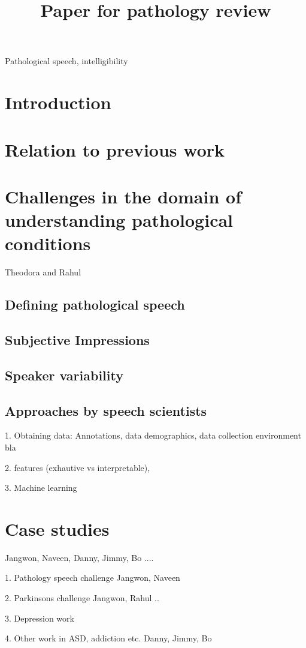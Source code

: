 \documentclass{article}
\title{Paper for pathology review}
\begin{document}
\ninept
%
\maketitle
%
\begin{abstract}
 
\end{abstract}
%
\begin{keywords}
Pathological speech, intelligibility 
\end{keywords}
%
\section{Introduction}
\label{sec:intro}

\section{Relation to previous work}

\section{Challenges in the domain of understanding pathological conditions}
Theodora and Rahul
\subsection{Defining pathological speech}
\subsection{Subjective Impressions}
\subsection{Speaker variability}
\subsection{Approaches by speech scientists}

1. Obtaining data: Annotations, data demographics, data collection environment
bla

2. features (exhautive vs interpretable),

3. Machine learning


\section{Case studies}
Jangwon, Naveen, Danny, Jimmy, Bo ....

1. Pathology speech challenge
Jangwon, Naveen

2. Parkinsons challenge
Jangwon, Rahul ..

3. Depression work

4. Other work in ASD, addiction etc. 
Danny, Jimmy, Bo
\vfill\pagebreak



\end{document}
